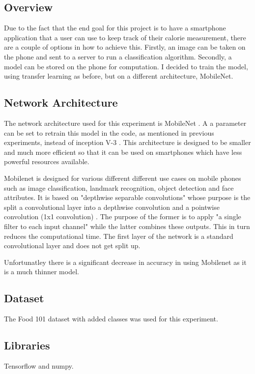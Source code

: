 \subsection*{Overview}
Due to the fact that the end goal for this project is to have a smartphone
application that a user can use to keep track of their calorie measurement,
there are a couple of options in how to achieve this. Firstly, an image can be
taken on the phone and sent to a server to run a classification algorithm.
Secondly, a model can be stored on the phone for computation. I decided to train
the model, using transfer learning as before, but on a different architecture,
MobileNet.

\subsection*{Network Architecture}
The network architecture used for this experiment is MobileNet \textcite{mobilenet}.
A a parameter can be set to retrain this model in the code, as mentioned in previous experiments, instead of inception V-3 \textcite{retrainInception}. 
This architecture is designed to be smaller and much more efficient so that
it can be used on smartphones which have less powerful resources available.

Mobilenet is designed for various different different use cases on mobile phones such as image classification, landmark recognition, object detection and face attributes.
It is based on "depthwise separable convolutions" whose purpose is the split a convolutional layer into a depthwise convolution and a pointwise convolution (1x1 convolution) \textcite{mobilenet}.
The purpose of the former is to apply "a single filter to each input channel" \textcite{mobilenet} while the latter combines these outputs.
This in turn reduces the computational time.
The first layer of the network is a standard convolutional layer and does not get split up.

Unfortunatley there is a significant decrease in accuracy in using Mobilenet as it is a much thinner model.

\subsection*{Dataset}
The Food 101 dataset \textcite{food101} with added classes was used for this experiment.

\subsection*{Libraries}
Tensorflow and numpy.

